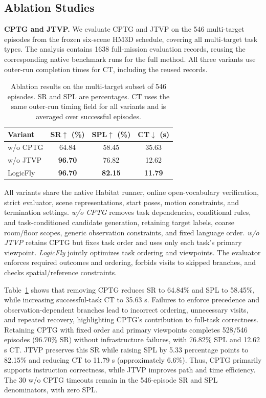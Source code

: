 \documentclass[letterpaper,10pt,journal]{IEEEtran}
\begin{document}
\subsection{Ablation Studies}


\textbf{CPTG and JTVP.}
We evaluate CPTG and JTVP on the 546 multi-target episodes from the frozen six-scene HM3D schedule, covering all multi-target task types. The analysis contains 1638 full-mission evaluation records, reusing the corresponding native benchmark runs for the full method. All three variants use outer-run completion times for CT, including the reused records.

\begin{table}[!hb]
\caption{Ablation results on the multi-target subset of 546 episodes. SR and SPL are percentages. CT uses the same outer-run timing field for all variants and is averaged over successful episodes.}
\label{tab:ablation}\centering\small\renewcommand{\arraystretch}{1.15}
\begin{tabular*}{\columnwidth}{@{\extracolsep{\fill}}lccc@{}}\toprule
Variant&SR$\uparrow$ (\%)&SPL$\uparrow$ (\%)&CT$\downarrow$ (s)\\\midrule
w/o CPTG&64.84&58.45&35.63\\
w/o JTVP&\textbf{96.70}&76.82&12.62\\
LogicFly&\textbf{96.70}&\textbf{82.15}&\textbf{11.79}\\\bottomrule
\end{tabular*}
\end{table}

All variants share the native Habitat runner, online open-vocabulary verification, strict evaluator, scene representations, start poses, motion constraints, and termination settings. \emph{w/o CPTG} removes task dependencies, conditional rules, and task-conditioned candidate generation, retaining target labels, coarse room/floor scopes, generic observation constraints, and fixed language order. \emph{w/o JTVP} retains CPTG but fixes task order and uses only each task's primary viewpoint. \emph{LogicFly} jointly optimizes task ordering and viewpoints. The evaluator enforces required outcomes and ordering, forbids visits to skipped branches, and checks spatial/reference constraints.







Table~\ref{tab:ablation} shows that removing CPTG reduces SR to 64.84\% and SPL to 58.45\%, while increasing successful-task CT to 35.63 s. Failures to enforce precedence and observation-dependent branches lead to incorrect ordering, unnecessary visits, and repeated recovery, highlighting CPTG's contribution to full-task correctness. Retaining CPTG with fixed order and primary viewpoints completes 528/546 episodes (96.70\% SR) without infrastructure failures, with 76.82\% SPL and 12.62 s CT. JTVP preserves this SR while raising SPL by 5.33 percentage points to 82.15\% and reducing CT to 11.79 s (approximately 6.6\%). Thus, CPTG primarily supports instruction correctness, while JTVP improves path and time efficiency. The 30 w/o CPTG timeouts remain in the 546-episode SR and SPL denominators, with zero SPL.
\end{document}
